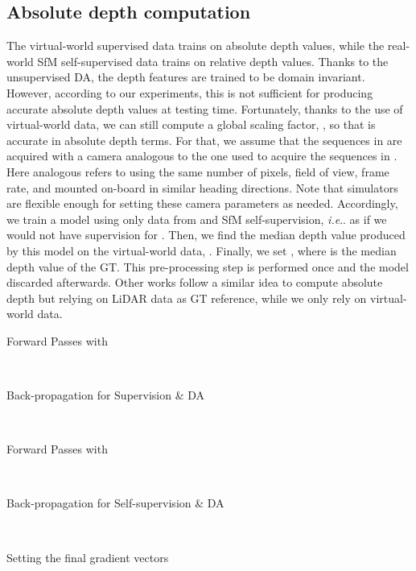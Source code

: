 \documentclass[journal]{IEEEtran}
\makeatletter
\DeclareRobustCommand\onedot{\futurelet\@let@token\@onedot}
\def\@onedot{\ifx\@let@token.\else.\null\fi\xspace}
\def\ie{\emph{i.e}\onedot} \def\Ie{\emph{I.e}\onedot}
\makeatother
\begin{document}
\subsection{Absolute depth computation} 
\label{ssec:scaling}

The virtual-world supervised data trains  on absolute depth values, while the real-world SfM self-supervised data trains  on relative depth values. Thanks to the unsupervised DA, the depth features  are trained to be domain invariant. However, according to our experiments, this is not sufficient for  producing accurate absolute depth values at testing time. Fortunately, thanks to the use of virtual-world data, we can still compute a global scaling factor, , so that  is accurate in absolute depth terms. For that, we assume that the sequences in  are acquired with a camera analogous to the one used to acquire the sequences in . Here analogous refers to using the same number of pixels, field of view, frame rate, and mounted on-board in similar heading directions. Note that simulators are flexible enough for setting these camera parameters as needed. Accordingly, we train a  model using only data from  and SfM self-supervision, {\ie} as if we would not have supervision for . Then, we find the median depth value produced by this model on the virtual-world data, . Finally, we set , where  is the median depth value of the GT. This pre-processing step is performed once and the model discarded afterwards. Other works follow a similar idea \cite{Zhou:2017, Godard:2019MonoDepth2, Cheng:2020S3Net, Guizilini:2020semantic, Zhao:2020} to compute absolute depth but relying on LiDAR data as GT reference, while we only rely on virtual-world data.




{
\begin{algorithm}
\caption{Computing the gradients , , ,  for a mini-batch .  refers to back-propagation on  with respect to weights .  is the empty set.}
\label{alg:gradientcomputation}
\end{algorithm}
\begin{minipage}{0.9\columnwidth}
{\centering Forward Passes with \par}
\vspace{-0.3cm}

\\
{\centering Back-propagation for Supervision \& DA\par}
\vspace{-0.3cm}

\\
{\centering Forward Passes with \par}
\vspace{-0.3cm}

\\
{\centering Back-propagation for Self-supervision \& DA\par}
\vspace{-0.3cm}

\\
{\centering Setting the final gradient vectors\par}
\vspace{-0.3cm}

\end{minipage}
}
\end{document}
